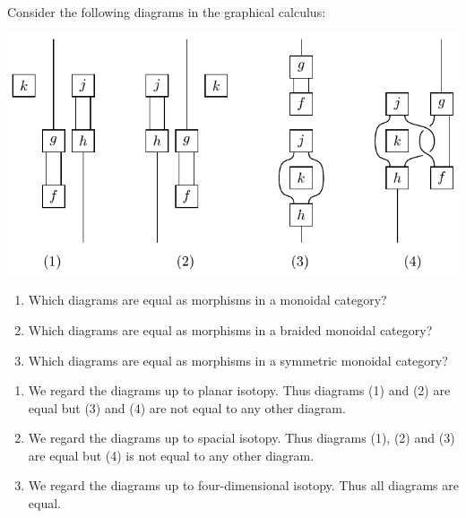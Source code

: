 \begin{exercise}
    Consider the following diagrams in the graphical calculus:

    \centering \includegraphics{monoidal-braided-symmetric-comparison}

    \begin{enumerate}
      \item Which diagrams are equal as morphisms in a monoidal category?
      \item Which diagrams are equal as morphisms in a braided monoidal category?
      \item Which diagrams are equal as morphisms in a symmetric monoidal category?
    \end{enumerate}
\end{exercise}

\begin{answer}
  \begin{enumerate}
  \item
    We regard the diagrams up to planar isotopy.
    Thus diagrams (1) and (2) are equal but (3) and (4) are not equal to any other diagram.
  \item
    We regard the diagrams up to spacial isotopy.
    Thus diagrams (1), (2) and (3) are equal but (4) is not equal to any other diagram.
  \item
    We regard the diagrams up to four-dimensional isotopy.
    Thus all diagrams are equal.
  \end{enumerate}
\end{answer}

